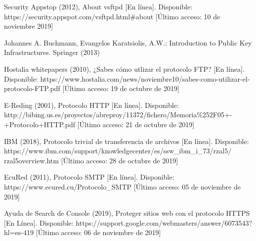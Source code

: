 \documentclass[12pt, a4paper, titlepage]{report}
\begin{document}
\begin{thebibliography}{20}
        Security Appstop (2012), About vsftpd [En línea]. Disponible:
        https://security.appspot.com/vsftpd.html\#about [Último acceso: 10 de noviembre 2019]
        
        Johannes A. Buchmann, Evangelos Karatsiolis, A.W.: Introduction to Public Key Infrastructures. Springer (2013)
        
        Hostalia whitepapers (2010), ¿Sabes cómo utlizar el protocolo FTP? [En línea]. Disponible: https://www.hostalia.com/news/noviembre10/sabes-como-utilizar-el-protocolo-FTP.pdf [Último acceso: 19 de octubre de 2019]
        
        E-Reding (2001), Protocolo HTTP [En línea]. Disponible: http://bibing.us.es/proyectos/abreproy/11372/fichero/Memoria\%252F05+-+Protocolo+HTTP.pdf [Último acceso: 21 de octubre de 2019]
        
        IBM (2018), Protocolo trivial de transferencia de archivos [En línea]. Disponible: https://www.ibm.com/support/knowledgecenter/es/ssw\_ibm\_i\_73/rzal5/\\rzal5overview.htm [Último acceso: 28 de octubre de 2019]
        
        EcuRed (2011), Protocolo SMTP [En línea]. Disponible: https://www.ecured.cu/Protocolo\_SMTP [Último acceso: 05 de noviembre de 2019] 
        
        Ayuda de Search de Console (2019), Proteger sitios web con el protocolo HTTPS [En Línea]. Disponible: https://support.google.com/webmasters/answer/6073543?hl=es-419 [Último acceso: 06 de noviembre de 2019]
	
	\end{thebibliography}	
\end{document}
